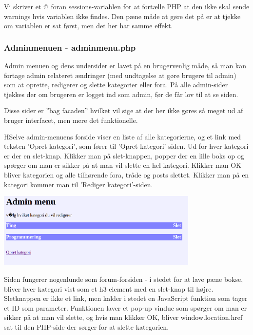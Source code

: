 \documentclass{article}
\begin{document}


Vi skriver et @ foran sessions-variablen for at fortælle PHP at den ikke skal sende warnings hvis variablen ikke findes. Den pæne måde at gøre det på er at tjekke om variablen er sat først, men det her har samme effekt.

\subsubsection[Adminmenuen]{Adminmenuen - adminmenu.php}
Admin menuen og dens undersider er lavet på en brugervenlig måde, så man kan fortage admin relateret ændringer (med undtagelse at gøre brugere til admin) som at oprette, redigerer og slette kategorier eller fora. På alle admin-sider tjekkes der om brugeren er logget ind som admin, før de får lov til at se siden.

Disse sider er ”bag facaden” hvilket vil sige at der her ikke gøres så meget ud af bruger interfacet, men mere det funktionelle.

HSelve admin-menuens forside viser en liste af alle kategorierne, og et link med teksten 'Opret kategori', som fører til 'Opret kategori'-siden. Ud for hver kategori er der en slet-knap. Klikker man på slet-knappen, popper der en lille boks op og spørger om man er sikker på at man vil slette en hel kategori. Klikker man OK bliver kategorien og alle tilhørende fora, tråde og posts slettet. Klikker man på en kategori kommer man til 'Rediger kategori'-siden. 

\includegraphics[width=100mm]{mi01.png}

Siden fungerer nogenlunde som forum-forsiden - i stedet for at lave pæne bokse, bliver hver kategori vist som et h3 element med en slet-knap til højre. Sletknappen er ikke et link, men kalder i stedet en JavaScript funktion som tager et ID som parameter. Funktionen laver et pop-up vindue som spørger om man er sikker på at man vil slette, og hvis man klikker OK, bliver window.location.href sat til den PHP-side der sørger for at slette kategorien.


\end{document}
